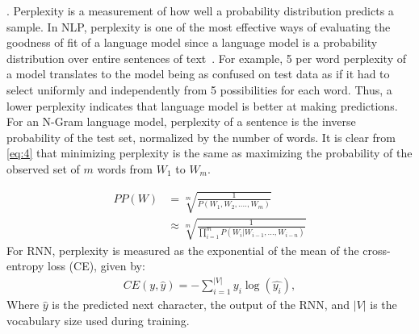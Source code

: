 . 
Perplexity is a measurement of how well a probability distribution predicts a sample. In NLP, perplexity is one of the most effective ways of evaluating the goodness of fit of a language model since a language model is a probability distribution over entire sentences of text~\citep{azzopardi2003investigating}. For example, 5 per word perplexity of a model translates to the model being as confused on test data as if it had to select uniformly and independently from 5 possibilities for each word. Thus, a lower perplexity indicates that language model is better at making predictions.
For an N-Gram language model, perplexity of a sentence is the inverse probability of
the test set, normalized by the number of words. It is clear from \eqref{eq:4} that minimizing perplexity is the same as maximizing the probability of the observed set of $m$ words from $W_{1}$ to $W_{m}$.

\begin{equation}\label{eq:4}
\begin{aligned}
PP(W) &= \sqrt[m]{\frac{1}{P(W_{1},W_{2},....,W_{m})}}\\
&\approx \sqrt[m]{\frac{1}{\displaystyle \prod_{i=1}^{m}P(W_{i} | W_{i-1},...,W_{i-n})}}
\end{aligned}
\end{equation}
For RNN, perplexity is measured as the exponential of the mean of the cross-entropy loss (CE), given by:
\begin{equation}
\begin{aligned}
CE(y, \hat{y}) = - \sum_{i=1}^{|V|} y_{i}\log(\hat{y_i}),
\end{aligned}
\end{equation}
Where $\hat{y}$ is the predicted next character, the output of the RNN, and $|V|$ is the vocabulary size used during training. 
